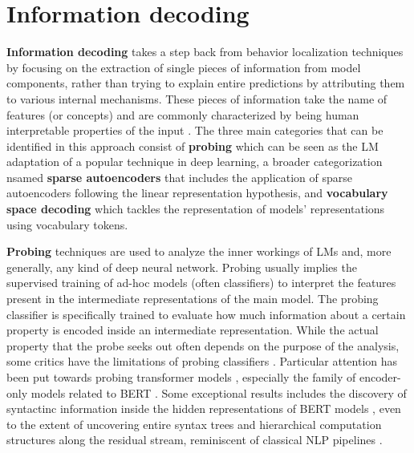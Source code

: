 
\section{Information decoding}

\textbf{Information decoding} takes a step back from behavior localization techniques by focusing on the extraction of single pieces of information from model components, rather than trying to explain entire predictions by attributing them to various internal mechanisms.
These pieces of information take the name of features (or concepts) and are commonly characterized by being human interpretable properties of the input \cite{kim2018}.
The three main categories that can be identified in this approach consist of \textbf{probing} which can be seen as the LM adaptation of a popular technique in deep learning, a broader categorization nsamed \textbf{sparse autoencoders} that includes the application of sparse autoencoders following the linear representation hypothesis, and \textbf{vocabulary space decoding} which tackles the representation of models' representations using vocabulary tokens.

\textbf{Probing} techniques are used to analyze the inner workings of LMs and, more generally, any kind of deep neural network.
Probing usually implies the supervised training of ad-hoc models (often classifiers) to interpret the features present in the intermediate representations of the main model.
The probing classifier is specifically trained to evaluate how much information about a certain property is encoded inside an intermediate representation.
While the actual property that the probe seeks out often depends on the purpose of the analysis, some critics have  the limitations of probing classifiers \cite{belinkov2022}.
Particular attention has been put towards probing transformer models \cite{chwang2024, zou2023, macdiarmid2024, burns2024}, especially the family of encoder-only models related to BERT \cite{devlin2018}.
Some exceptional results includes the discovery of syntactinc information inside the hidden representations of BERT models \cite{tenney2019a, lin2019, liu2019}, even to the extent of uncovering entire syntax trees \cite{hewitt2019} and hierarchical computation structures along the residual stream, reminiscent of classical NLP pipelines \cite{tenney2019b}.


